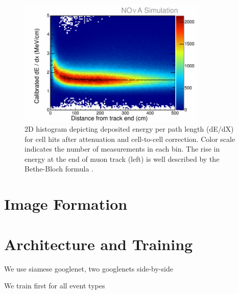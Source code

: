 \begin{figure}[t]
\begin{center}
\includegraphics[width=0.8\textwidth]{figures/plots/reco/calib_dEdX.png}
\end{center}
\caption{2D histogram depicting deposited energy per path length (dE/dX) for
cell hits after attenuation and cell-to-cell correction.  Color scale
indicates the number of measurements in each bin.  The rise in energy at the
end of muon track (left) is well described by the Bethe-Bloch formula \cite{pdg}.}
\label{calib_dEdX}
\end{figure}

\section{Image Formation}

\section{Architecture and Training}

We use siamese googlenet, two googlenets side-by-side

We train first for all event types



